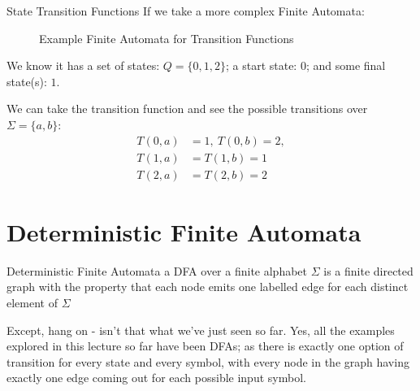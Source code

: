 \begin{example}{State Transition Functions}
If we take a more complex Finite Automata:
\begin{figure}[H]
    \centering
    \caption{Example Finite Automata for Transition Functions}
    \label{fig:eg-fa-transitionfunction}
\end{figure}

We know it has a set of states: $Q = \{0, 1, 2\}$; a start state: $0$; and some final state(s): $1$.

We can take the transition function and see the possible transitions over $\Sigma = \{a,b\}$:
\begin{align*}
T(0,a) &= 1,\ T(0,b) = 2,\\
T(1,a) &= T(1,b) = 1\\
T(2,a) &= T(2,b) = 2
\end{align*}

\end{example}

\section{Deterministic Finite Automata}
\begin{define}
\item[Deterministic Finite Automata] a DFA over a finite alphabet $\Sigma$ is a finite directed graph with the property that each node emits one labelled edge for each distinct element of $\Sigma$
\end{define}
Except, hang on - isn't that what we've just seen so far. Yes, all the examples explored in this lecture so far have been DFAs; as there is exactly one option of transition for every state and every symbol, with every node in the graph having exactly one edge coming out for each possible input symbol. 

